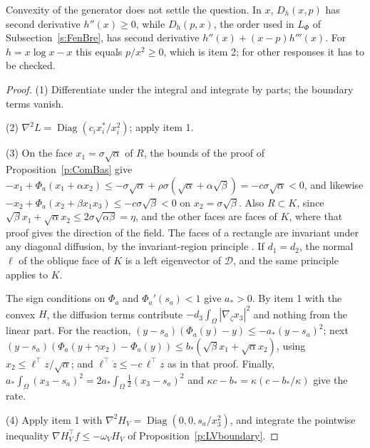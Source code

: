 Convexity of the generator does not settle the question. In $x$, $D_h(x,p)$ has second derivative $h''(x)\ge0$, while $D_h(p,x)$, the order used in $L_\Phi$ of Subsection~\ref{s:FenBre}, has second derivative $h''(x)+(x-p)h'''(x)$. For $h=x\log x-x$ this equals $p/x^2\ge0$, which is item 2; for other responses it has to be checked.
\eeR
\begin{proof}
(1) Differentiate under the integral and integrate by parts; the boundary terms vanish.

(2) $\nabla^2L=\operatorname{Diag}(c_ix_i^*/x_i^2)$; apply item 1.

(3) On the face $x_1=\sigma\sqrt\alpha$ of $R$, the bounds of the proof of Proposition~\ref{p:ComBas} give $-x_1+\Phi_a(x_1+\alpha x_2)\le-\sigma\sqrt\alpha+\rho\sigma(\sqrt\alpha+\alpha\sqrt\beta)=-c\sigma\sqrt\alpha<0$, and likewise $-x_2+\Phi_a(x_2+\beta x_1x_3)\le-c\sigma\sqrt\beta<0$ on $x_2=\sigma\sqrt\beta$. Also $R\subset K$, since $\sqrt\beta x_1+\sqrt\alpha x_2\le2\sigma\sqrt{\alpha\beta}=\eta$, and the other faces are faces of $K$, where that proof gives the direction of the field. The faces of a rectangle are invariant under any diagonal diffusion, by the invariant-region principle \cite{Smoller1994}. If $d_1=d_2$, the normal $\ell$ of the oblique face of $K$ is a left eigenvector of $\mathcal D$, and the same principle applies to $K$.

The sign conditions on $\Phi_a$ and $\Phi_a'(s_a)<1$ give $a_*>0$. By item 1 with the convex $H$, the diffusion terms contribute $-d_3\int_\Omega|\nabla_\zeta x_3|^2$ and nothing from the linear part. For the reaction, $(y-s_a)(\Phi_a(y)-y)\le-a_*(y-s_a)^2$; next $(y-s_a)(\Phi_a(y+\gamma x_2)-\Phi_a(y))\le b_*(\sqrt\beta x_1+\sqrt\alpha x_2)$, using $x_2\le\ell^\top z/\sqrt\alpha$; and $\ell^\top\dot z\le-c\,\ell^\top z$ as in that proof. Finally, $a_*\int_\Omega(x_3-s_a)^2=2a_*\int_\Omega\frac12(x_3-s_a)^2$ and $\kappa c-b_*=\kappa(c-b_*/\kappa)$ give the rate.

(4) Apply item 1 with $\nabla^2H_V=\operatorname{Diag}(0,0,s_a/x_3^2)$, and integrate the pointwise inequality $\nabla H_V^\top f\le-\omega_VH_V$ of Proposition~\ref{p:LVboundary}.
\end{proof}

